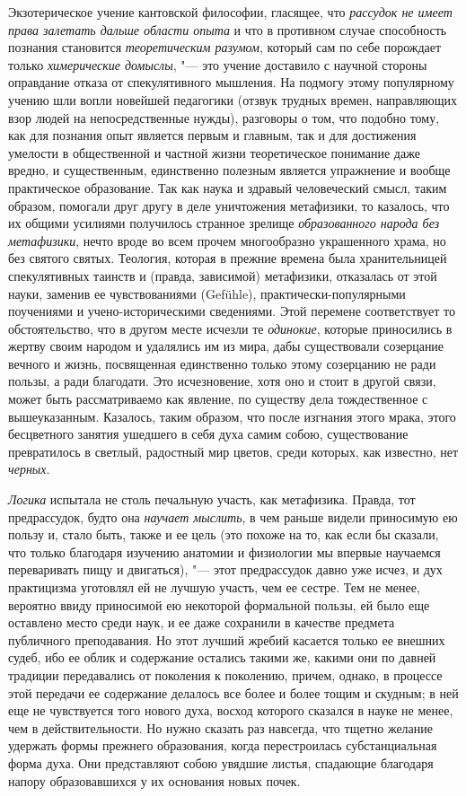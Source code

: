 \label{bkm:Ref474526580} Экзотерическое учение кантовской философии,
гласящее, что {\em рассудок не имеет права залетать дальше области опыта}
и что в противном случае способность познания становится
{\em теоретическим разумом}, который сам по себе
порождает только {\em химерические домыслы}, "--- это
учение доставило с научной стороны оправдание отказа от спекулятивного
мышления. На подмогу этому популярному учению шли вопли новейшей педагогики
(отзвук трудных времен, направляющих взор людей на непосредственные нужды),
разговоры о том, что подобно тому, как для познания опыт является первым и
главным, так и для достижения умелости в общественной и частной жизни
теоретическое понимание даже вредно, и существенным, единственно полезным
является упражнение и вообще практическое образование. Так как наука и
здравый человеческий смысл, таким образом, помогали друг другу в деле
уничтожения метафизики, то казалось, что их общими усилиями получилось
странное зрелище {\em образованного народа без
метафизики}, нечто вроде во всем прочем многообразно украшенного храма, но
без святого святых. Теология, которая в прежние времена была хранительницей
спекулятивных таинств и (правда, зависимой) метафизики, отказалась от этой
науки, заменив ее чувствованиями (Gefühle), практически-популярными
поучениями и учено-историческими сведениями. Этой перемене соответствует то
обстоятельство, что в другом месте исчезли те
{\em одинокие}, которые приносились в жертву своим
народом и удалялись им из мира, дабы существовали созерцание вечного и
жизнь, посвященная единственно только этому созерцанию не ради пользы, а
ради благодати. Это исчезновение, хотя оно и стоит в другой связи, может
быть рассматриваемо как явление, по существу дела тождественное с
вышеуказанным. Казалось, таким образом, что после изгнания этого мрака,
этого бесцветного занятия ушедшего в себя духа самим собою, существование
превратилось в светлый, радостный мир цветов, среди которых, как известно,
нет {\em черных}.

{\em Логика} испытала не столь печальную участь, как
метафизика. Правда, тот предрассудок, будто она
{\em научает мыслить}, в чем раньше видели приносимую
ею пользу и, стало быть, также и ее цель (это похоже на то, как если бы
сказали, что только благодаря изучению анатомии и физиологии мы впервые
научаемся переваривать пищу и двигаться), "--- этот предрассудок давно уже
исчез, и дух практицизма уготовлял ей не лучшую участь, чем ее сестре. Тем
не менее, вероятно ввиду приносимой ею некоторой формальной пользы, ей было
еще оставлено место среди наук, и ее даже сохранили в качестве предмета
публичного преподавания. Но этот лучший жребий касается только ее внешних
судеб, ибо ее облик и содержание остались такими же, какими они по давней
традиции передавались от поколения к поколению, причем, однако, в процессе
этой передачи ее содержание делалось все более и более тощим и скудным; в
ней еще не чувствуется того нового духа, восход которого сказался в науке
не менее, чем в действительности. Но нужно сказать раз навсегда, что тщетно
желание удержать формы прежнего образования, когда перестроилась
субстанциальная форма духа. Они представляют собою увядшие листья,
спадающие благодаря напору образовавшихся у их основания новых почек.

